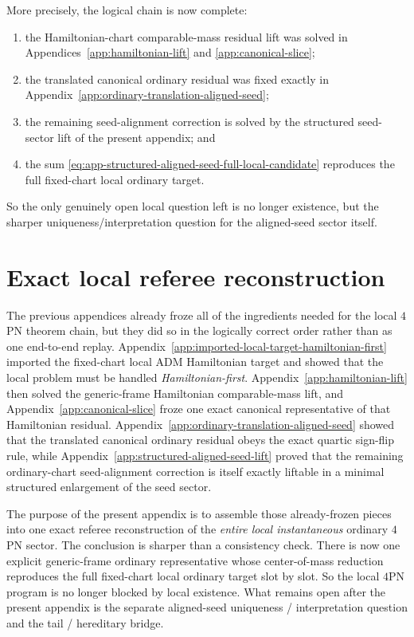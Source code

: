 \documentclass[11pt]{article}
\begin{document}
More precisely, the logical chain is now complete:
\begin{enumerate}
\item the Hamiltonian-chart comparable-mass residual lift was solved in
Appendices~\ref{app:hamiltonian-lift} and \ref{app:canonical-slice};
\item the translated canonical ordinary residual was fixed exactly in
Appendix~\ref{app:ordinary-translation-aligned-seed};
\item the remaining seed-alignment correction is solved by the structured
seed-sector lift of the present appendix; and
\item the sum \eqref{eq:app-structured-aligned-seed-full-local-candidate}
reproduces the full fixed-chart local ordinary target.
\end{enumerate}
So the only genuinely open local question left is no longer existence, but the
sharper uniqueness/interpretation question for the aligned-seed sector itself.


\section{Exact local referee reconstruction}
\label{app:local-referee-reconstruction}

The previous appendices already froze all of the ingredients needed for the
local $4$PN theorem chain, but they did so in the logically correct order rather
than as one end-to-end replay.  Appendix~\ref{app:imported-local-target-hamiltonian-first}
imported the fixed-chart local ADM Hamiltonian target and showed that the local
problem must be handled \emph{Hamiltonian-first}.  Appendix~\ref{app:hamiltonian-lift}
then solved the generic-frame Hamiltonian comparable-mass lift, and
Appendix~\ref{app:canonical-slice} froze one exact canonical representative of
that Hamiltonian residual.  Appendix~\ref{app:ordinary-translation-aligned-seed}
showed that the translated canonical ordinary residual obeys the exact quartic
sign-flip rule, while Appendix~\ref{app:structured-aligned-seed-lift} proved
that the remaining ordinary-chart seed-alignment correction is itself exactly
liftable in a minimal structured enlargement of the seed sector.

The purpose of the present appendix is to assemble those already-frozen pieces
into one exact referee reconstruction of the \emph{entire local instantaneous}
ordinary $4$PN sector.  The conclusion is sharper than a consistency check.
There is now one explicit generic-frame ordinary representative whose center-of-mass
reduction reproduces the full fixed-chart local ordinary target slot by slot.
So the local $4$PN program is no longer blocked by local existence.  What remains
open after the present appendix is the separate aligned-seed uniqueness /
interpretation question and the tail / hereditary bridge.
\end{document}
